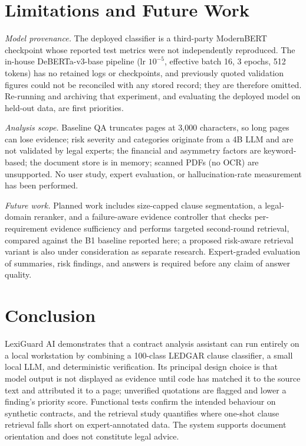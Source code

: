 \documentclass[conference]{IEEEtran}
\begin{document}
\section{Limitations and Future Work}
\label{sec:lim}
\textit{Model provenance.} The deployed classifier is a third-party ModernBERT checkpoint whose reported test metrics were not independently reproduced. The in-house DeBERTa-v3-base pipeline (lr $10^{-5}$, effective batch 16, 3 epochs, 512 tokens) has no retained logs or checkpoints, and previously quoted validation figures could not be reconciled with any stored record; they are therefore omitted. Re-running and archiving that experiment, and evaluating the deployed model on held-out data, are first priorities.

\textit{Analysis scope.} Baseline QA truncates pages at 3{,}000 characters, so long pages can lose evidence; risk severity and categories originate from a 4B LLM and are not validated by legal experts; the financial and asymmetry factors are keyword-based; the document store is in memory; scanned PDFs (no OCR) are unsupported. No user study, expert evaluation, or hallucination-rate measurement has been performed.

\textit{Future work.} Planned work includes size-capped clause segmentation, a legal-domain reranker, and a failure-aware evidence controller that checks per-requirement evidence sufficiency and performs targeted second-round retrieval, compared against the B1 baseline reported here; a proposed risk-aware retrieval variant is also under consideration as separate research. Expert-graded evaluation of summaries, risk findings, and answers is required before any claim of answer quality.

\section{Conclusion}
LexiGuard AI demonstrates that a contract analysis assistant can run entirely on a local workstation by combining a 100-class LEDGAR clause classifier, a small local LLM, and deterministic verification. Its principal design choice is that model output is not displayed as evidence until code has matched it to the source text and attributed it to a page; unverified quotations are flagged and lower a finding's priority score. Functional tests confirm the intended behaviour on synthetic contracts, and the retrieval study quantifies where one-shot clause retrieval falls short on expert-annotated data. The system supports document orientation and does not constitute legal advice.
\end{document}
